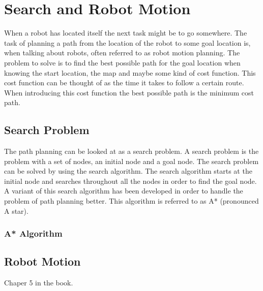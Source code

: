 
\section{Search and Robot Motion} %
\label{sec:search_and_robot_motion}

When a robot has located itself the next task might be to go somewhere. The task of planning a path from the location of the robot to some goal location is, when talking about robots, often referred to as robot motion planning. The problem to solve is to find the best possible path for the goal location when knowing the start location, the map and maybe some kind of cost function. This cost function can be thought of as the time it takes to follow a certain route. When introducing this cost function the best possible path is the minimum cost path. \\

\subsection{Search Problem} %
\label{sub:search_problem}

The path planning can be looked at as a search problem. A search problem is the problem with a set of nodes, an initial node and a goal node. The search problem can be solved by using the search algorithm. The search algorithm starts at the initial node and searches throughout all the nodes in order to find the goal node. A variant of this search algorithm has been developed in order to handle the problem of path planning better. This algorithm is referred to as A* (pronounced A star). \\

\subsubsection{A* Algorithm} %
\label{subsub:a_algorithm}




\subsection{Robot Motion} %
\label{sub:robot_motion}

Chaper 5 in the book.

